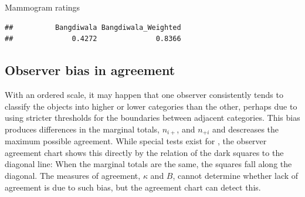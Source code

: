 \documentclass[11pt]{book}
\renewenvironment{knitrout}{\small\renewcommand{\baselinestretch}{.85}}{} %
\begin{document}
\begin{Example}[mammograms]{Mammogram ratings}
\begin{knitrout}
\color{fgcolor}\begin{kframe}
\begin{alltt}
\hlstd{(B)[}\hlopt{:}\hlstd{]}
\end{alltt}
\begin{verbatim}
##          Bangdiwala Bangdiwala_Weighted 
##              0.4272              0.8366
\end{verbatim}
\end{kframe}
\end{knitrout}


\end{Example}
\subsection{Observer bias in agreement}\label{sec:twoway-observer}

With an ordered scale, it may happen that one observer consistently
tends to classify the objects into higher or lower categories than
the other, perhaps due to using stricter thresholds for the
boundaries between adjacent categories.
This bias produces differences in the marginal totals,
\(n_{i+}\), and \(n_{+i}\) and descreases the maximum possible agreement.  
While special tests exist for
, the observer agreement chart shows this
directly by the relation of the dark squares to the diagonal line:
When the marginal totals are the same, the squares fall along the
diagonal.
The measures of agreement, $\kappa$ and $B$, cannot determine
whether lack of agreement is due to such bias, but the agreement chart can
detect this.
\end{document}
